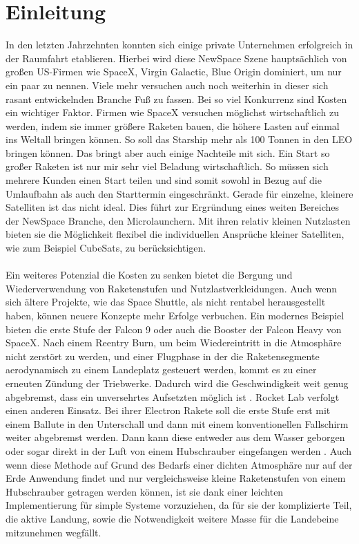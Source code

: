 \chapter{Einleitung}

In den letzten Jahrzehnten konnten sich einige private Unternehmen erfolgreich in der Raumfahrt etablieren. Hierbei wird diese NewSpace Szene hauptsächlich von großen US-Firmen wie SpaceX, Virgin Galactic, Blue Origin dominiert, um nur ein paar zu nennen. Viele mehr versuchen auch noch weiterhin in dieser sich rasant entwickelnden Branche Fuß zu fassen. Bei so viel Konkurrenz sind Kosten ein wichtiger Faktor. Firmen wie SpaceX versuchen möglichst wirtschaftlich zu werden, indem sie immer größere Raketen bauen, die höhere Lasten auf einmal ins Weltall bringen können. So soll das Starship mehr als 100 Tonnen in den \gls{LEO} \cite{starShipUserGuide} bringen können. Das bringt aber auch einige Nachteile mit sich. Ein Start so großer Raketen ist nur mir sehr viel Beladung wirtschaftlich. So müssen sich mehrere Kunden einen Start teilen und sind somit sowohl in Bezug auf die Umlaufbahn als auch den Starttermin eingeschränkt. Gerade für einzelne, kleinere Satelliten ist das nicht ideal. Dies führt zur Ergründung eines weiten Bereiches der NewSpace Branche, den Microlaunchern. Mit ihren relativ kleinen Nutzlasten bieten sie die Möglichkeit flexibel die individuellen Ansprüche kleiner Satelliten, wie zum Beispiel CubeSats, zu berücksichtigen.
\\~\\
Ein weiteres Potenzial die Kosten zu senken bietet die Bergung und Wiederverwendung von Raketenstufen und Nutzlastverkleidungen. Auch wenn sich ältere Projekte, wie das Space Shuttle, als nicht rentabel herausgestellt haben, können neuere Konzepte mehr Erfolge verbuchen. Ein modernes Beispiel bieten die erste Stufe der Falcon 9 oder auch die Booster der Falcon Heavy von SpaceX. Nach einem Reentry Burn, um beim Wiedereintritt in die Atmosphäre nicht zerstört zu werden, und einer Flugphase in der die Raketensegmente aerodynamisch zu einem Landeplatz gesteuert werden, kommt es zu einer erneuten Zündung der Triebwerke. Dadurch wird die Geschwindigkeit weit genug abgebremst, dass ein unversehrtes Aufsetzten möglich ist \cite{falconUserGuide}.
Rocket Lab verfolgt einen anderen Einsatz. Bei ihrer Electron Rakete soll die erste Stufe erst mit einem Ballute in den Unterschall und dann mit einem konventionellen Fallschirm weiter abgebremst werden. Dann kann diese entweder aus dem Wasser geborgen oder sogar direkt in der Luft von einem Hubschrauber eingefangen werden \cite{electronRocketLab}. Auch wenn diese Methode auf Grund des Bedarfs einer dichten Atmosphäre nur auf der Erde Anwendung findet und nur vergleichsweise kleine Raketenstufen von einem Hubschrauber getragen werden können, ist sie dank einer leichten Implementierung für simple Systeme vorzuziehen, da für sie der komplizierte Teil, die aktive Landung, sowie die Notwendigkeit weitere Masse für die Landebeine mitzunehmen wegfällt.
